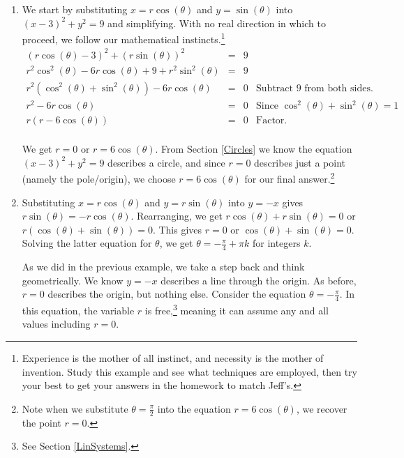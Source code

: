 \documentclass{ximera}
\begin{document}
\begin{example}
\begin{enumerate}
\begin{enumerate}

\item We start by substituting  $x = r\cos(\theta)$ and $y = \sin(\theta)$ into $(x-3)^2 + y^2 = 9$ and simplifying.  With no real direction in which to proceed, we follow our mathematical instincts.\footnote{Experience is the mother of all instinct, and necessity is the mother of invention.  Study this example and see what techniques are employed, then try your best to get your answers in the homework to match Jeff's.}
\[ \begin{array}{rclr}

(r\cos(\theta) - 3)^2+ (r\sin(\theta))^2 & = & 9& \\[3pt]
r^2\cos^2(\theta) - 6 r\cos(\theta) + 9 + r^2 \sin^{2}(\theta) & = &  9 \\[3pt]
r^2\left(\cos^2(\theta) + \sin^{2}(\theta)\right) - 6 r\cos(\theta) & = & 0 & \text{Subtract $9$ from both sides.}\\[3pt]
r^2 - 6 r\cos(\theta) & = & 0 & \text{Since $\cos^2(\theta) + \sin^2(\theta) = 1$} \\[3pt]
r(r - 6 \cos(\theta)) & = & 0 &  \text{Factor.} \\ \end{array} \]

We get $r = 0$ or $r = 6\cos(\theta)$.  From Section \ref{Circles} we know the equation $(x-3)^2 + y^2 = 9$ describes a circle, and since $r=0$ describes just a point (namely the pole/origin), we choose $r = 6\cos(\theta)$ for our final answer.\footnote{Note when we substitute $\theta = \frac{\pi}{2}$ into the equation $r = 6\cos(\theta)$,  we recover the point $r = 0$.}

\item  Substituting $x = r\cos(\theta)$ and $y = r\sin(\theta)$ into $y=-x$ gives $r\sin(\theta)= -r\cos(\theta)$.  Rearranging, we get  $r\cos(\theta) + r\sin(\theta) = 0$ or $r(\cos(\theta) + \sin(\theta)) = 0$.  This gives $r=0$ or $\cos(\theta) + \sin(\theta) = 0$.  Solving the latter equation for $\theta$, we get $\theta = -\frac{\pi}{4} + \pi k$ for integers $k$. 

\smallskip

As we did in the previous example, we take a step back and think geometrically. We know $y=-x$ describes a line through the origin.  As before, $r=0$ describes the origin, but nothing else.  Consider the equation $\theta = -\frac{\pi}{4}$.  In this equation, the variable $r$ is free,\footnote{See Section \ref{LinSystems}.} meaning it can assume any and all values including $r=0$. 


\end{enumerate}
\end{enumerate}
\end{example}
\end{document}
